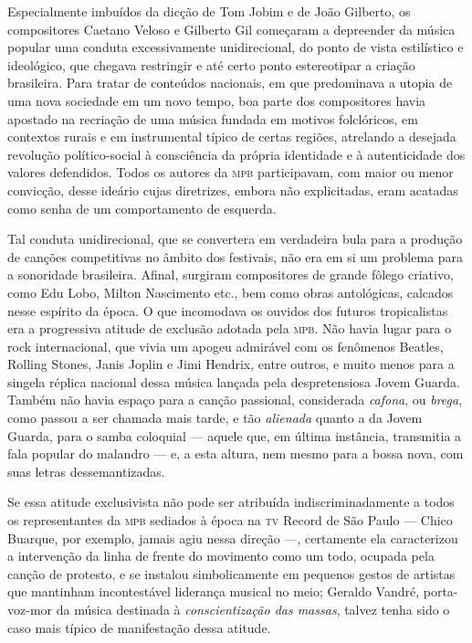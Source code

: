 Especialmente imbuídos da dicção de Tom Jobim e de João Gilberto, os
compositores Caetano Veloso e Gilberto Gil começaram a depreender da
música popular uma conduta excessivamente unidirecional, do ponto de
vista estilístico e ideológico, que chegava restringir e até certo ponto
estereotipar a criação brasileira. Para tratar de conteúdos nacionais,
em que predominava a utopia de uma nova sociedade em um novo tempo,
boa parte dos compositores havia apostado na recriação de uma música
fundada em motivos folclóricos, em contextos rurais e em instrumental
típico de certas regiões, atrelando a desejada revolução político-social
à consciência da própria identidade e à autenticidade dos valores
defendidos. Todos os autores da \textsc{mpb} participavam, com maior ou menor
convicção, desse ideário cujas diretrizes, embora não explicitadas, eram
acatadas como senha de um comportamento de esquerda.

Tal conduta unidirecional, que se convertera em verdadeira bula para a
produção de canções competitivas no âmbito dos festivais, não era em si
um problema para a sonoridade brasileira. Afinal, surgiram compositores
de grande fôlego criativo, como Edu Lobo, Milton Nascimento etc., bem como
obras antológicas, calcados nesse espírito da época. O que incomodava os
ouvidos dos futuros tropicalistas era a progressiva atitude de exclusão
adotada pela \textsc{mpb}. Não havia lugar para o rock internacional, que vivia
um apogeu admirável com os fenômenos Beatles, Rolling Stones, Janis
Joplin e Jimi Hendrix, entre outros, e muito menos para a singela
réplica nacional dessa música lançada pela despretensiosa Jovem Guarda.
Também não havia espaço para a canção passional, considerada \textit{cafona}, ou \textit{brega}, como passou a ser chamada mais tarde, e tão \textit{alienada}
quanto a da Jovem Guarda, para o samba coloquial --- aquele que, em última
instância, transmitia a fala popular do malandro --- e, a esta altura, nem
mesmo para a bossa nova, com suas letras dessemantizadas.

Se essa atitude exclusivista não pode ser atribuída indiscriminadamente
a todos os representantes da \textsc{mpb} sediados à época na \textsc{tv} Record de São
Paulo --- Chico Buarque, por exemplo, jamais agiu nessa direção ---,
certamente ela caracterizou a intervenção da linha de frente do
movimento como um todo, ocupada pela canção de protesto, e se instalou
simbolicamente em pequenos gestos de artistas que mantinham
incontestável liderança musical no meio; Geraldo Vandré, porta-voz-mor
da música destinada à \textit{conscientização das massas}, talvez tenha sido
o caso mais típico de manifestação dessa atitude.

